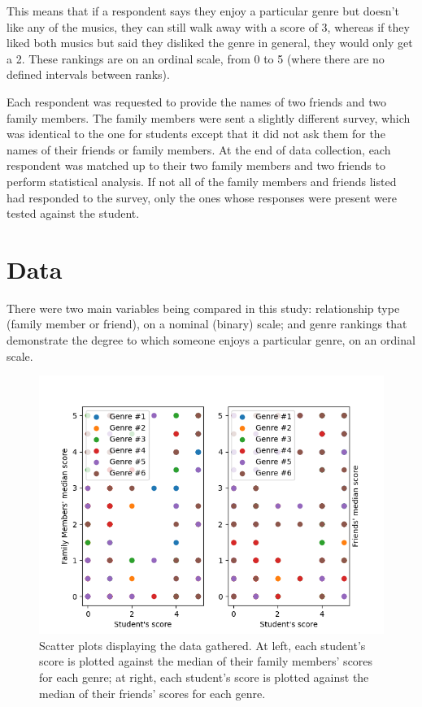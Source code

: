 \documentclass[12pt]{report}
\begin{document}
This means that if a respondent says they enjoy a particular genre but doesn't like any of the musics, they can still walk away with a score of 3, whereas if they liked both musics but said they disliked the genre in general, they would only get a 2. These rankings are on an ordinal scale, from 0 to 5 (where there are no defined intervals between ranks).

Each respondent was requested to provide the names of two friends and two family members. The family members were sent a slightly different survey, which was identical to the one for students except that it did not ask them for the names of their friends or family members. At the end of data collection, each respondent was matched up to their two family members and two friends to perform statistical analysis. If not all of the family members and friends listed had responded to the survey, only the ones whose responses were present were tested against the student.

\chapter*{Data}
There were two main variables being compared in this study: relationship type (family member or friend), on a nominal (binary) scale; and genre rankings that demonstrate the degree to which someone enjoys a particular genre, on an ordinal scale.

\begin{figure}[h!]
  \centerline{\includegraphics{scatter_plots.png}}
  \caption{\small Scatter plots displaying the data gathered. At left, each student's score is plotted against the median of their family members' scores for each genre; at right, each student's score is plotted against the median of their friends' scores for each genre.}
\end{figure}
\end{document}
